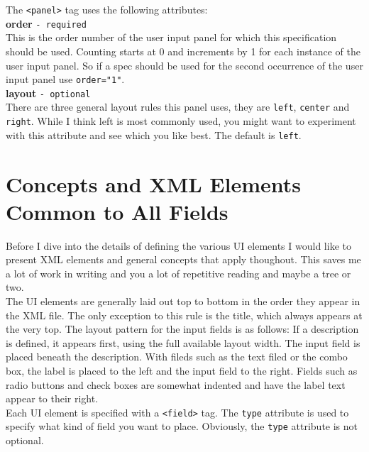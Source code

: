 The \texttt{<panel>} tag uses the following attributes:\\

\textbf{order} \texttt{- required}\\

This is the order number of the user input panel for which this
specification should be used. Counting starts at 0 and increments by 1
for each instance of the user input panel. So if a spec should be used
for the second occurrence of the user input panel use
\texttt{order="1"}.\\

\textbf{layout} \texttt{- optional}\\

There are three general layout rules this panel uses, they are
\texttt{left}, \texttt{center} and \texttt{right}. While I think left is
most commonly used, you might want to experiment with this attribute and
see which you like best. The default is \texttt{left}.\\


\section{Concepts and XML Elements Common to All Fields}

Before I dive into the details of defining the various UI elements I
would like to present XML elements and general concepts that apply
thoughout. This saves me a lot of work in writing and you a lot of
repetitive reading and maybe a tree or two.\\

The UI elements are generally laid out top to bottom in the order they
appear in the XML file. The only exception to this rule is the title,
which always appears at the very top. The layout pattern for the input
fields is as follows: If a description is defined, it appears first,
using the full available layout width. The input field is placed beneath
the description. With fileds such as the text filed or the combo box,
the label is placed to the left and the input field to the right. Fields
such as radio buttons and check boxes are somewhat indented and have the
label text appear to their right.\\

Each UI element is specified with a \texttt{<field>} tag. The
\texttt{type} attribute is used to specify what kind of field you want
to place. Obviously, the \texttt{type} attribute is not optional.\\

